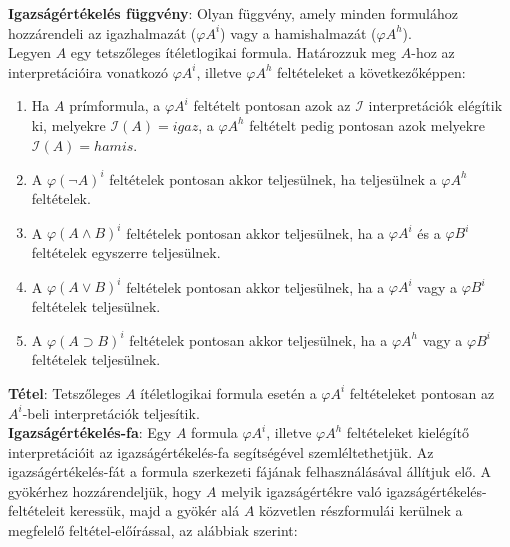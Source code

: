 \documentclass[margin=0px]{article}
\begin{document}
\noindent \textbf{Igazságértékelés függvény}:  Olyan függvény, amely minden formulához hozzárendeli az igazhalmazát ($\varphi A^{i}$) vagy
a hamishalmazát ($\varphi A^{h}$).\\

Legyen $A$ egy tetszőleges ítéletlogikai formula. Határozzuk meg $A$-hoz az interpretációira vonatkozó $\varphi A^{i}$, illetve
$\varphi A^{h}$ feltételeket a következőképpen:

\begin{enumerate}
    \item	Ha $A$ prímformula, a $\varphi A^{i}$ feltételt pontosan azok az $\mathcal{I}$ interpretációk elégítik ki,  melyekre
          $\mathcal{I}(A)=igaz$, a $\varphi A^{h}$ feltételt pedig pontosan azok melyekre	$\mathcal{I}(A)=hamis$.

    \item	A $\varphi (\neg A)^{i}$ feltételek pontosan akkor teljesülnek, ha teljesülnek a $\varphi A^{h}$ feltételek.

    \item	A $\varphi (A \wedge B)^{i}$ feltételek pontosan akkor teljesülnek, ha a $\varphi A^{i}$ és a $\varphi B^{i}$ feltételek egyszerre teljesülnek.

    \item	A $\varphi (A \vee B)^{i}$ feltételek pontosan akkor teljesülnek, ha a $\varphi A^{i}$ vagy a $\varphi B^{i}$ feltételek teljesülnek.

    \item	A $\varphi (A \supset B)^{i}$ feltételek pontosan akkor teljesülnek, ha a $\varphi A^{h}$ vagy a $\varphi B^{i}$ feltételek teljesülnek.
\end{enumerate}

\noindent \textbf{Tétel}: Tetszőleges $A$ ítéletlogikai formula esetén a  $\varphi A^{i}$ feltételeket pontosan az  $A^{i}$-beli
interpretációk teljesítik.\\

\noindent \textbf{Igazságértékelés-fa}:  Egy $A$ formula $\varphi A^{i}$, illetve $\varphi A^{h}$ feltételeket kielégítő interpretációit
az igazságértékelés-fa segítségével szemléltethetjük. Az igazságértékelés-fát a formula szerkezeti fájának felhasználásával állítjuk elő.
A gyökérhez hozzárendeljük, hogy $A$ melyik igazságértékre való igazságértékelés-feltételeit keressük, majd a gyökér alá $A$ közvetlen részformulái kerülnek a megfelelő feltétel-előírással, az alábbiak szerint:
\end{document}
